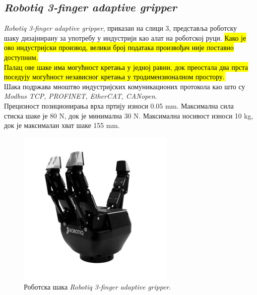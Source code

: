\documentclass{article}
\begin{document}
\subsection{\textit{Robotiq 3-finger adaptive gripper}} 
\textit{Robotiq 3-finger adaptive gripper}, приказан на слици 3, представља роботску шаку дизајнирану за употребу 
у индустрији као алат на роботској руци. \hl{Како је ово индустријски производ, велики број података произвођач 
није поставио доступним.\\ 
Палац ове шаке има могућност кретања у једној равни, док 
преостала два прста поседују могућност независног кретања у тродимензионалном простору.}\\
Шака подржава мноштво индустријских комуникационих протокола као што су 
\textit{Modbus TCP, PROFINET, EtherCAT, CANopen}.\\
Прецизност позиционирања врха пртију износи 0.05 mm. Максимална сила стиска шаке је 80 N, док је минимална 30 N. 
Максимална носивост износи 10 kg, док је максималан хват шаке 155 mm. \cite{robotique}
\begin{figure}[H]
\centering
\includegraphics[width=3in, height=3in]{Images/Saka2.png}
\caption{Роботска шака \textit{Robotiq 3-finger adaptive gripper}. \cite{robotique}}
\label{fig:figure3}
\end{figure}
\end{document}
